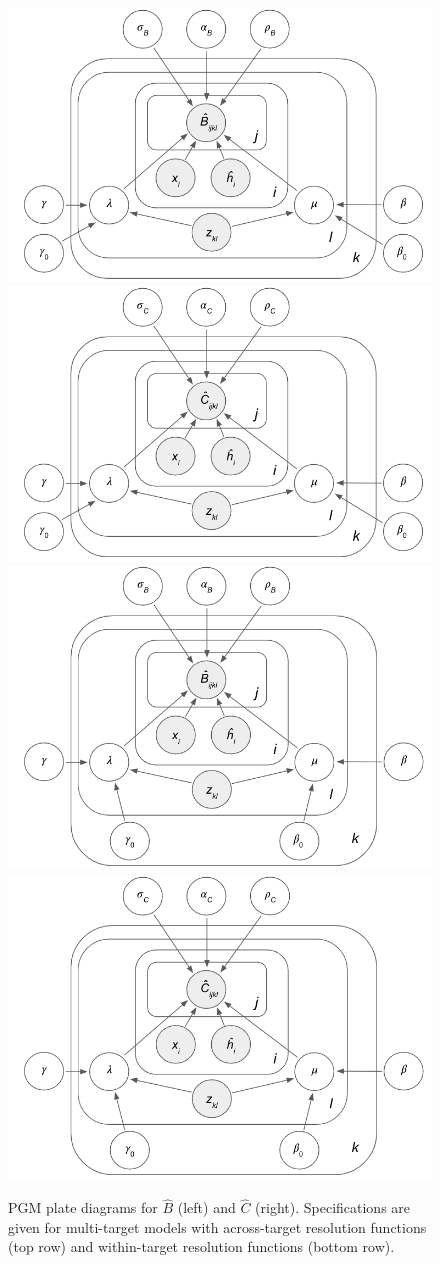 \documentclass[../thesis.tex]{subfiles}
\begin{document}
\begin{figure}
    \centering
    \includegraphics[width=.45\textwidth]{figures/chapter2/LAMP_ATM_B_PGM.png} \includegraphics[width=.45\textwidth]{figures/chapter2/LAMP_ATM_C_PGM.png} \\
    \vspace{10pt}
    \includegraphics[width=.45\textwidth]{figures/chapter2/LAMP_WTM_B_PGM.png} \includegraphics[width=.45\textwidth]{figures/chapter2/LAMP_WTM_C_PGM.png}
    \caption{PGM plate diagrams for $\hat{B}$ (left) and $\hat{C}$ (right). Specifications are given for multi-target models with across-target resolution functions (top row) and within-target resolution functions (bottom row).}
    \label{fig:mtm_pgms}
\end{figure}
\end{document}
